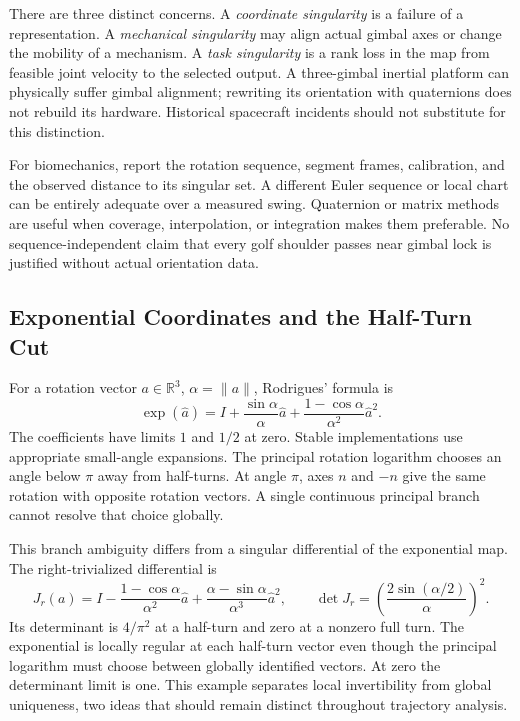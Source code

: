 There are three distinct concerns. A \emph{coordinate singularity} is a
failure of a representation. A \emph{mechanical singularity} may align actual
gimbal axes or change the mobility of a mechanism. A \emph{task singularity}
is a rank loss in the map from feasible joint velocity to the selected output.
A three-gimbal inertial platform can physically suffer gimbal alignment;
rewriting its orientation with quaternions does not rebuild its hardware.
Historical spacecraft incidents should not substitute for this distinction.

For biomechanics, report the rotation sequence, segment frames, calibration,
and the observed distance to its singular set. A different Euler sequence or
local chart can be entirely adequate over a measured swing. Quaternion or
matrix methods are useful when coverage, interpolation, or integration makes
them preferable. No sequence-independent claim that every golf shoulder
passes near gimbal lock is justified without actual orientation data.

\subsection{Exponential Coordinates and the Half-Turn Cut}

For a rotation vector $a\in\mathbb R^3$, $\alpha=\|a\|$, Rodrigues' formula is
\begin{equation}\label{eq:manifold_rodrigues}
 \exp(\widehat a)=I+\frac{\sin\alpha}{\alpha}\widehat a
       +\frac{1-\cos\alpha}{\alpha^2}\widehat a^2.
\end{equation}
The coefficients have limits $1$ and $1/2$ at zero. Stable implementations
use appropriate small-angle expansions. The principal rotation logarithm
chooses an angle below $\pi$ away from half-turns. At angle $\pi$, axes $n$
and $-n$ give the same rotation with opposite rotation vectors. A single
continuous principal branch cannot resolve that choice globally.

This branch ambiguity differs from a singular differential of the exponential
map. The right-trivialized differential is
\begin{equation}\label{eq:manifold_exp_jacobian}
 J_r(a)=I-\frac{1-\cos\alpha}{\alpha^2}\widehat a
       +\frac{\alpha-\sin\alpha}{\alpha^3}\widehat a^2,
 \qquad \det J_r=\left(\frac{2\sin(\alpha/2)}{\alpha}\right)^2.
\end{equation}
Its determinant is $4/\pi^2$ at a half-turn and zero at a nonzero full turn.
The exponential is locally regular at each half-turn vector even though the
principal logarithm must choose between globally identified vectors. At
zero the determinant limit is one. This example separates local invertibility
from global uniqueness, two ideas that should remain distinct throughout
trajectory analysis.

